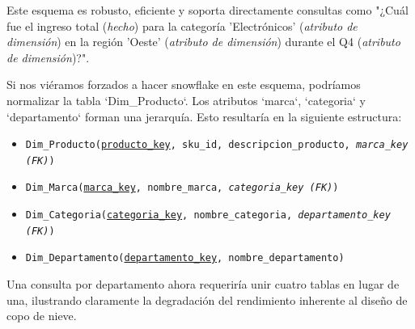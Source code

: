 \documentclass{article}
\begin{document}
Este esquema es robusto, eficiente y soporta directamente consultas como "¿Cuál fue el ingreso total (\textit{hecho}) para la categoría 'Electrónicos' (\textit{atributo de dimensión}) en la región 'Oeste' (\textit{atributo de dimensión}) durante el Q4 (\textit{atributo de dimensión})?".

Si nos viéramos forzados a hacer snowflake en este esquema, podríamos normalizar la tabla `Dim_Producto`. Los atributos `marca`, `categoria` y `departamento` forman una jerarquía. Esto resultaría en la siguiente estructura:
\begin{itemize}
    \item \texttt{Dim\_Producto(\underline{producto\_key}, sku\_id, descripcion\_producto, \textit{marca\_key (FK)})}
    \item \texttt{Dim\_Marca(\underline{marca\_key}, nombre\_marca, \textit{categoria\_key (FK)})}
    \item \texttt{Dim\_Categoria(\underline{categoria\_key}, nombre\_categoria, \textit{departamento\_key (FK)})}
    \item \texttt{Dim\_Departamento(\underline{departamento\_key}, nombre\_departamento)}
\end{itemize}
Una consulta por departamento ahora requeriría unir cuatro tablas en lugar de una, ilustrando claramente la degradación del rendimiento inherente al diseño de copo de nieve.
\end{document}
